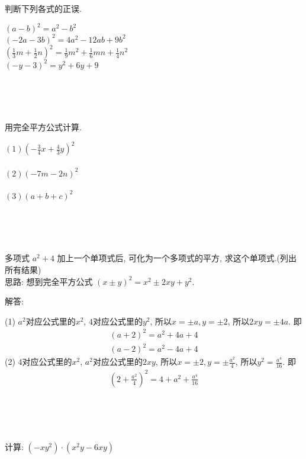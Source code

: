\item{
    判断下列各式的正误.

    $(a-b)^2 = a^2 - b^2$\\
    $(-2a-3b)^2 = 4a^2 - 12ab +9b^2$\\
    $(\frac13 m + \frac12 n)^2 = \frac19 m^2 + \frac16 mn + \frac14 n^2$\\
    $(-y-3)^2 = y^2 + 6y + 9$
}
\\ \\ \\

\item{
    用完全平方公式计算.

    $(1) (-\frac34 x + \frac43 y)^2$ \\ \\

    $(2) (-7m-2n)^2$ \\ \\
    
    $(3) (a+b+c)^2$ \\ \\
}
\\ \\

\item{
    多项式 $a^2 + 4$ 加上一个单项式后, 可化为一个多项式的平方, 求这个单项式.(列出所有结果)
    \ifshowSolution
    \fangsong{}
    \\
    思路: 想到完全平方公式 $(x\pm y)^2 = x^2 \pm 2xy + y^2$.

    解答: 

    (1) $a^2$对应公式里的$x^2$, $4$对应公式里的$y^2$, 所以$x= \pm a, y= \pm 2$, 所以$2xy = \pm 4a$. 即
    \begin{align*}
        (a+2)^2 = a^2 + 4a + 4 \\
        (a-2)^2 = a^2 - 4a + 4
    \end{align*}
    (2) $4$对应公式里的$x^2$, $a^2$对应公式里的$2xy$, 所以$x= \pm 2, y=\pm \frac{a^2}{4}$, 所以$y^2 = \frac{a^4}{16}$. 即
    \begin{align*}
        (2 + \frac{a^2}{4})^2 = 4 + a^2 + \frac{a^4}{16}
    \end{align*}
    \fi
}
\\ \\ \\

\item{
    计算: $(-xy^2)\cdot (x^2y - 6xy)$
}
\\ \\ \\

